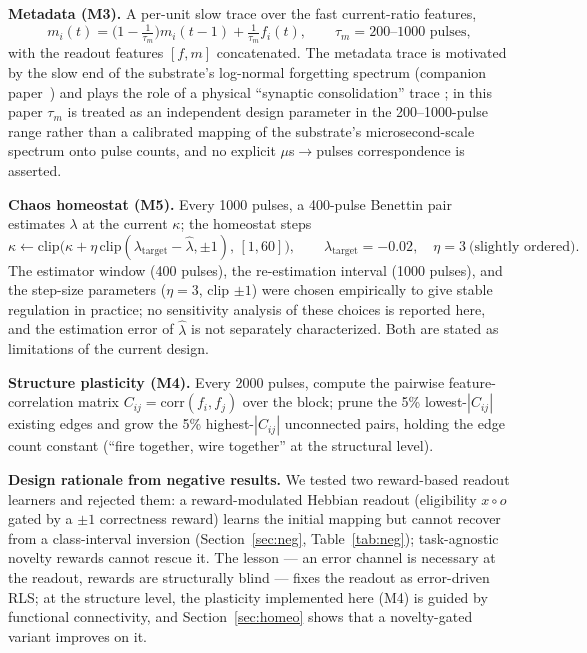 \documentclass[11pt]{article}
\begin{document}
\textbf{Metadata (M3).} A per-unit slow trace over the fast current-ratio
features,
\begin{equation}
m_i(t) = \big(1-\tfrac{1}{\tau_m}\big)m_i(t-1) + \tfrac{1}{\tau_m} f_i(t),
\qquad \tau_m = 200\text{--}1000 \text{ pulses},
\label{eq:metadata}
\end{equation}
with the readout features $[f, m]$ concatenated. The metadata trace is
motivated by the slow end of the substrate's log-normal forgetting spectrum
(companion paper~\cite{companionA}) and plays the role of a physical
``synaptic consolidation'' trace \cite{benna2016,fusi2005}; in this paper $\tau_m$ is
treated as an independent design parameter in the 200--1000-pulse range
rather than a calibrated mapping of the substrate's microsecond-scale
spectrum onto pulse counts, and no explicit $\mu$s$\to$pulses
correspondence is asserted.

\textbf{Chaos homeostat (M5).} Every 1000 pulses, a 400-pulse Benettin pair
estimates $\lambda$ at the current $\kappa$; the homeostat steps
\begin{equation}
\kappa \leftarrow \mathrm{clip}\big(\kappa + \eta\,\mathrm{clip}
(\lambda_{\mathrm{target}}-\hat\lambda,\pm1),\, [1,60]\big), \qquad
\lambda_{\mathrm{target}}=-0.02, \quad \eta=3 \ \text{(slightly ordered)}.
\label{eq:homeostat}
\end{equation}
The estimator window (400 pulses), the re-estimation interval (1000 pulses),
and the step-size parameters ($\eta=3$, clip $\pm1$) were chosen empirically
to give stable regulation in practice; no sensitivity analysis of these
choices is reported here, and the estimation error of $\hat\lambda$ is not
separately characterized. Both are stated as limitations of the current
design.

\textbf{Structure plasticity (M4).} Every 2000 pulses, compute the pairwise
feature-correlation matrix $C_{ij}=\mathrm{corr}(f_i, f_j)$ over the block;
prune the 5\% lowest-$|C_{ij}|$ existing edges and grow the 5\% highest-$|C_{ij}|$
unconnected pairs, holding the edge count constant (``fire together, wire
together'' at the structural level).

\textbf{Design rationale from negative results.} We tested two reward-based
readout learners and rejected them: a reward-modulated Hebbian readout
(eligibility $x\circ o$ gated by a $\pm1$ correctness reward) learns the
initial mapping but cannot recover from a class-interval inversion
(Section~\ref{sec:neg}, Table~\ref{tab:neg}); task-agnostic novelty rewards
cannot rescue it. The lesson --- an error channel is necessary at the readout,
rewards are structurally blind --- fixes the readout as error-driven RLS; at
the structure level, the plasticity implemented here (M4) is guided by
functional connectivity, and Section~\ref{sec:homeo} shows that a
novelty-gated variant improves on it.
\end{document}
